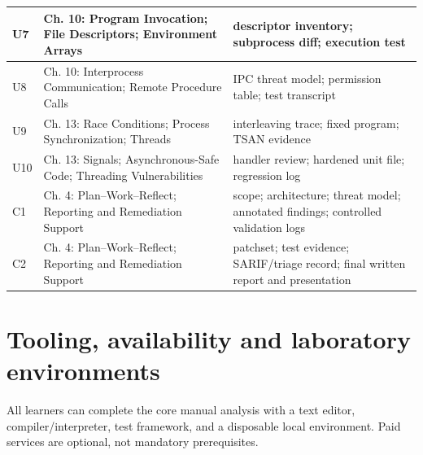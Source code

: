 \documentclass[10pt,letterpaper]{article}
\begin{document}
\begin{longtable}{>{\raggedright\arraybackslash}p{}>{\raggedright\arraybackslash}p{}>{\raggedright\arraybackslash}p{}}
U7 & Ch. 10: Program Invocation; File Descriptors; Environment Arrays & descriptor inventory; subprocess diff; execution test\\\midrule
U8 & Ch. 10: Interprocess Communication; Remote Procedure Calls & IPC threat model; permission table; test transcript\\\midrule
U9 & Ch. 13: Race Conditions; Process Synchronization; Threads & interleaving trace; fixed program; TSAN evidence\\\midrule
U10 & Ch. 13: Signals; Asynchronous-Safe Code; Threading Vulnerabilities & handler review; hardened unit file; regression log\\\midrule
C1 & Ch. 4: Plan--Work--Reflect; Reporting and Remediation Support & scope; architecture; threat model; annotated findings; controlled validation logs\\\midrule
C2 & Ch. 4: Plan--Work--Reflect; Reporting and Remediation Support & patchset; test evidence; SARIF/triage record; final written report and presentation\\\midrule
\bottomrule\end{longtable}\endgroup
\section{Tooling, availability and laboratory environments}
All learners can complete the core manual analysis with a text editor, compiler/interpreter, test framework, and a disposable local environment. Paid services are optional, not mandatory prerequisites.
\end{document}

